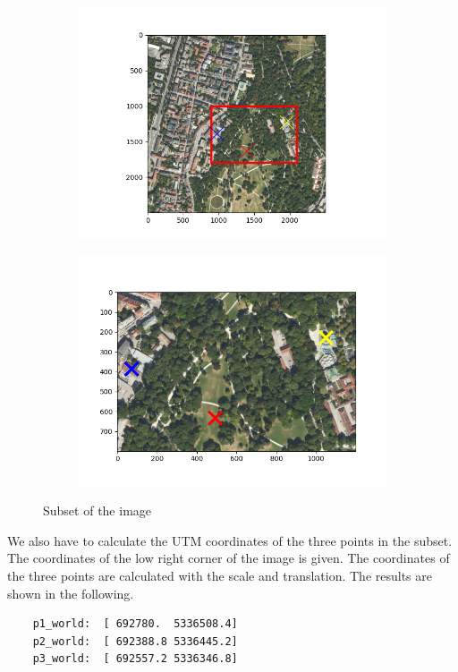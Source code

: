 \documentclass[12pt
,headinclude
,headsepline
,bibtotocnumbered
]{scrartcl}
\begin{document}
\begin{figure}[H]
    \centering
    \begin{subfigure}{0.45\textwidth}
        \centering
        \includegraphics[width=1.5\textwidth]{ex02_task1_1.png}
        \label{fig:sub1}
    \end{subfigure}
    \hfill
    \begin{subfigure}{0.45\textwidth}
        \centering
        \includegraphics[width=1\textwidth]{ex02_task1_2.png}
        \label{fig:sub2}
    \end{subfigure}
    \caption{Subset of the image}
    \label{fig:main}
\end{figure}
We also have to calculate the UTM coordinates of the three points in the subset. The coordinates of the low right corner of the image is given. The coordinates of the three points are calculated with the scale and translation. The results are shown in the following. 
\begin{verbatim}
    p1_world:  [ 692780.  5336508.4]
    p2_world:  [ 692388.8 5336445.2]
    p3_world:  [ 692557.2 5336346.8]
\end{verbatim}
\end{document}
